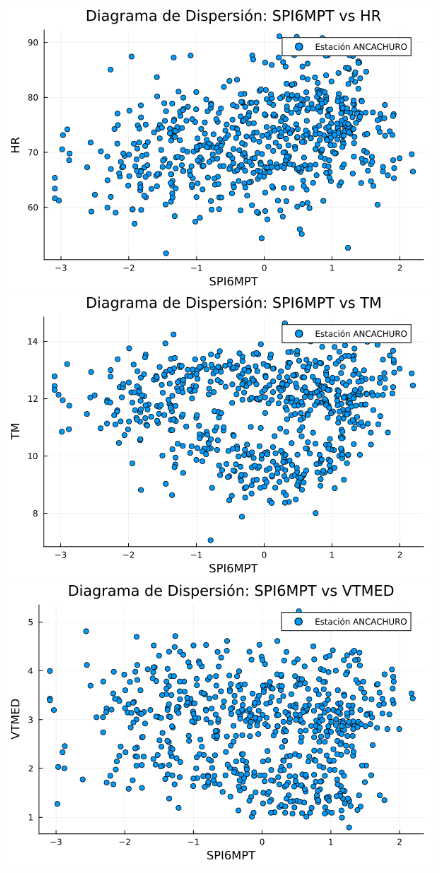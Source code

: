 \begin{figure}[H]
\begin{minipage}{0.33\textwidth}
    \centering
    \includegraphics[width=\linewidth]{Capitulos/Scaterplot/ANCACHURO_SPI6MPT_vs_HR.png}
\end{minipage}\hfill
\begin{minipage}{0.33\textwidth}
    \centering
    \includegraphics[width=\linewidth]{Capitulos/Scaterplot/ANCACHURO_SPI6MPT_vs_TM.png}
\end{minipage}\hfill
\begin{minipage}{0.33\textwidth}
    \centering
    \includegraphics[width=\linewidth]{Capitulos/Scaterplot/ANCACHURO_SPI6MPT_vs_VTMED.png}
\end{minipage}


\end{figure}
